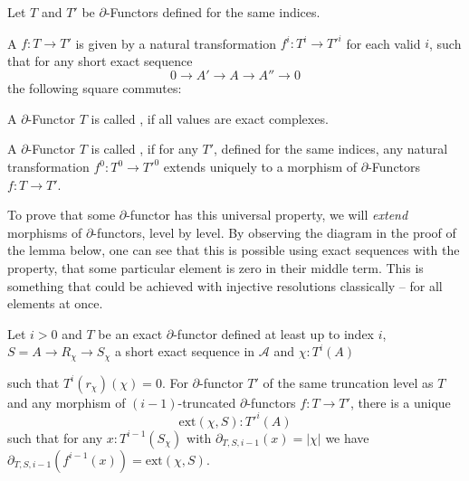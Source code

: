 \begin{definition}
  Let $T$ and $T'$ be $\partial$-Functors defined for the same indices.
  
  A  $f:T\to T'$ is given by a natural transformation $f^i:T^i\to T'^i$ for each valid $i$,
  such that for any short exact sequence
  \[ 0\to A'\to A\to A''\to 0\]
  the following square commutes:
  \begin{center}
  \end{center}
\end{definition}

\begin{definition}
  A $\partial$-Functor $T$ is called ,
  if all values are exact complexes.
\end{definition}

\begin{definition}
  A $\partial$-Functor $T$ is called , if for any $T'$, defined for the same indices,
  any natural transformation $f^0:T^0\to T'^0$ extends uniquely to a morphism of $\partial$-Functors $f:T\to T'$.
\end{definition}

To prove that some $\partial$-functor has this universal property,
we will \emph{extend} morphisms of $\partial$-functors, level by level.
By observing the diagram in the proof of the lemma below,
one can see that this is possible using exact sequences with the property,
that some particular element is zero in their middle term.
This is something that could be achieved with injective resolutions classically -- for all elements at once.

\begin{lemma}
  \label{lem:extend-map}
  Let $i>0$ and $T$ be an exact $\partial$-functor defined at least up to index $i$, $S=A\to R_\chi\to S_\chi$ a short exact sequence in $\mathcal A$
  and $\chi:T^i(A)$
  \begin{center}
  \end{center}
  such that $T^i(r_\chi)(\chi)=0$.
  For $\partial$-functor $T'$ of the same truncation level as $T$
  and any morphism of $(i-1)$-truncated $\partial$-functors $f:T\to T'$, there is a unique
  \[\mathrm{ext}(\chi,S) : T'^i(A)\]
  such that for any $x:T^{i-1}(S_\chi)$ with $\partial_{T,S,i-1}(x)=|\chi|$ we have $\partial_{T,S,i-1}(f^{i-1}(x))=\mathrm{ext}(\chi,S)$.
\end{lemma}

